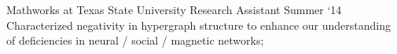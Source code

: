 \experience
    {Mathworks at Texas State University}
    {Research Assistant}
    {Summer `14}
    {
        Characterized negativity in hypergraph structure to enhance our understanding of
        deficiencies in neural / social / magnetic networks;
    }
